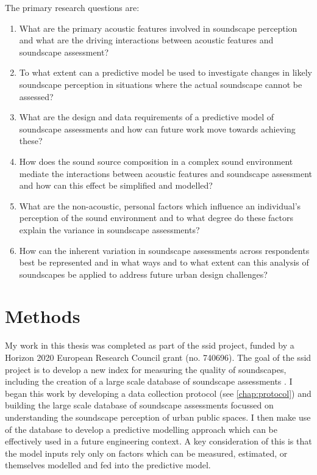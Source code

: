 The primary research questions are:

\begin{enumerate}
  \item What are the primary acoustic features involved in soundscape perception and what are the driving interactions between acoustic features and soundscape assessment?
  \item To what extent can a predictive model be used to investigate changes in likely soundscape perception in situations where the actual soundscape cannot be assessed?
  \item What are the design and data requirements of a predictive model of soundscape assessments and how can future work move towards achieving these?
  \item How does the sound source composition in a complex sound environment mediate the interactions between acoustic features and soundscape assessment and how can this effect be simplified and modelled?
  \item What are the non-acoustic, personal factors which influence an individual's perception of the sound environment and to what degree do these factors explain the variance in soundscape assessments? 
  \item How can the inherent variation in soundscape assessments across respondents best be represented and in what ways and to what extent can this analysis of soundscapes be applied to address future urban design challenges? 
\end{enumerate}

\section{Methods}

My work in this thesis was completed as part of the \gls{ssid} project, funded by a Horizon 2020 European Research Council grant (no. 740696). The goal of the \gls{ssid} project is to develop a new index for measuring the quality of soundscapes, including the creation of a large scale database of soundscape assessments \citep{Kang2019Towards}. I began this work by developing a data collection protocol (see \cref{chap:protocol}) and building the large scale database of soundscape assessments focussed on understanding the soundscape perception of urban public spaces. I then make use of the database to develop a predictive modelling approach which can be effectively used in a future engineering context. A key consideration of this is that the model inputs rely only on factors which can be measured, estimated, or themselves modelled and fed into the predictive model. 

